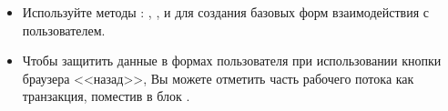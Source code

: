 \documentclass[a4paper,10pt,twoside]{book}
\begin{document}
\begin{itemize}
\item Используйте методы : , ,
 и  для создания базовых форм
взаимодействия с пользователем.
\item Чтобы защитить данные в формах пользователя при использовании
кнопки браузера <<назад>>, Вы можете отметить часть рабочего потока как
транзакция, поместив в блок .
\end{itemize}

\ifx\wholebook\relax\else 
   
   
\end{document}
